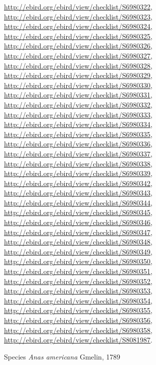\documentclass[9pt, article]{memoir}
\begin{document}
\begin{multicols}{2}
\url{http://ebird.org/ebird/view/checklist/S6980322}, 
\url{http://ebird.org/ebird/view/checklist/S6980323}, 
\url{http://ebird.org/ebird/view/checklist/S6980324}, 
\url{http://ebird.org/ebird/view/checklist/S6980325}, 
\url{http://ebird.org/ebird/view/checklist/S6980326}, 
\url{http://ebird.org/ebird/view/checklist/S6980327}, 
\url{http://ebird.org/ebird/view/checklist/S6980328}, 
\url{http://ebird.org/ebird/view/checklist/S6980329}, 
\url{http://ebird.org/ebird/view/checklist/S6980330}, 
\url{http://ebird.org/ebird/view/checklist/S6980331}, 
\url{http://ebird.org/ebird/view/checklist/S6980332}, 
\url{http://ebird.org/ebird/view/checklist/S6980333}, 
\url{http://ebird.org/ebird/view/checklist/S6980334}, 
\url{http://ebird.org/ebird/view/checklist/S6980335}, 
\url{http://ebird.org/ebird/view/checklist/S6980336}, 
\url{http://ebird.org/ebird/view/checklist/S6980337}, 
\url{http://ebird.org/ebird/view/checklist/S6980338}, 
\url{http://ebird.org/ebird/view/checklist/S6980339}, 
\url{http://ebird.org/ebird/view/checklist/S6980342}, 
\url{http://ebird.org/ebird/view/checklist/S6980343}, 
\url{http://ebird.org/ebird/view/checklist/S6980344}, 
\url{http://ebird.org/ebird/view/checklist/S6980345}, 
\url{http://ebird.org/ebird/view/checklist/S6980346}, 
\url{http://ebird.org/ebird/view/checklist/S6980347}, 
\url{http://ebird.org/ebird/view/checklist/S6980348}, 
\url{http://ebird.org/ebird/view/checklist/S6980349}, 
\url{http://ebird.org/ebird/view/checklist/S6980350}, 
\url{http://ebird.org/ebird/view/checklist/S6980351}, 
\url{http://ebird.org/ebird/view/checklist/S6980352}, 
\url{http://ebird.org/ebird/view/checklist/S6980353}, 
\url{http://ebird.org/ebird/view/checklist/S6980354}, 
\url{http://ebird.org/ebird/view/checklist/S6980355}, 
\url{http://ebird.org/ebird/view/checklist/S6980356}, 
\url{http://ebird.org/ebird/view/checklist/S6980358}, 
\url{http://ebird.org/ebird/view/checklist/S8081987}.

\vspace{6pt}\noindent\hspace{36pt}Species \textit{Anas americana} Gmelin, 1789



\end{multicols}
\end{document}
